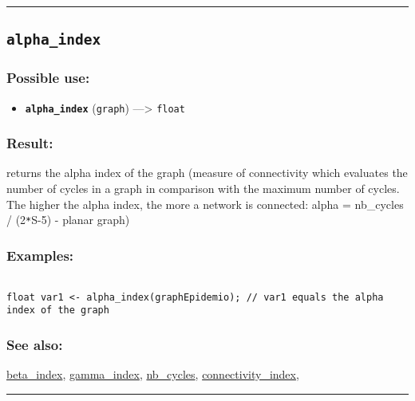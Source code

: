 \documentclass[]{book}
\providecommand{\tightlist}{%
  \setlength{\itemsep}{0pt}\setlength{\parskip}{0pt}}
\theoremstyle{definition}
\theoremstyle{definition}
\theoremstyle{definition}
\theoremstyle{remark}
\begin{document}
\begin{center}\rule{0.5\linewidth}{\linethickness}\end{center}

\subsection{\texorpdfstring{\texttt{alpha\_index}}{alpha\_index}}\label{alpha_index}

\subsubsection{Possible use:}\label{possible-use-33}

\begin{itemize}
\tightlist
\item
  \textbf{\texttt{alpha\_index}} (\texttt{graph}) ---\textgreater{}
  \texttt{float}
\end{itemize}

\subsubsection{Result:}\label{result-32}

returns the alpha index of the graph (measure of connectivity which
evaluates the number of cycles in a graph in comparison with the maximum
number of cycles. The higher the alpha index, the more a network is
connected: alpha = nb\_cycles / (2\texttt{*}S-5) - planar graph)

\subsubsection{Examples:}\label{examples-26}

\begin{verbatim}
 
float var1 <- alpha_index(graphEpidemio); // var1 equals the alpha index of the graph
\end{verbatim}

\subsubsection{See also:}\label{see-also-24}

\href{OperatorsBC\#beta_index}{beta\_index},
\href{OperatorsDH\#gamma_index}{gamma\_index},
\href{OperatorsNR\#nb_cycles}{nb\_cycles},
\href{OperatorsBC\#connectivity_index}{connectivity\_index},

\begin{center}\rule{0.5\linewidth}{\linethickness}\end{center}
\end{document}
